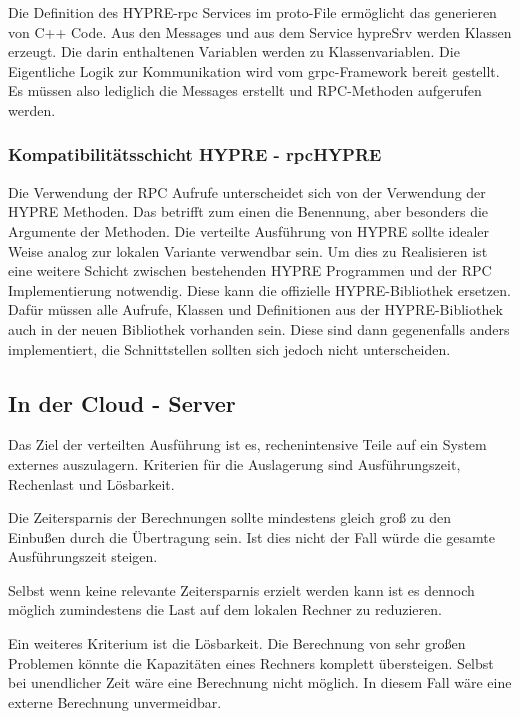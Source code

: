\documentclass[a4paper,10pt]{article}
\numberwithin{figure}{section}
\numberwithin{table}{section}
\begin{document}
Die Definition des HYPRE-rpc Services im proto-File ermöglicht das generieren von C++ Code.
Aus den Messages und aus dem Service hypreSrv werden Klassen erzeugt.
Die darin enthaltenen Variablen werden zu Klassenvariablen.
Die Eigentliche Logik zur Kommunikation wird vom grpc-Framework bereit gestellt.
Es müssen also lediglich die Messages erstellt und RPC-Methoden aufgerufen werden.

\subsubsection{Kompatibilitätsschicht HYPRE - rpcHYPRE}

Die Verwendung der RPC Aufrufe unterscheidet sich von der Verwendung der HYPRE Methoden.
Das betrifft zum einen die Benennung, aber besonders die Argumente der Methoden.
Die verteilte Ausführung von HYPRE sollte idealer Weise analog zur lokalen Variante verwendbar sein.
Um dies zu Realisieren ist eine weitere Schicht zwischen bestehenden HYPRE Programmen und der RPC Implementierung notwendig.
Diese kann die offizielle HYPRE-Bibliothek ersetzen.
Dafür müssen alle Aufrufe, Klassen und Definitionen aus der HYPRE-Bibliothek auch in der neuen Bibliothek vorhanden sein.
Diese sind dann gegenenfalls anders implementiert, die Schnittstellen sollten sich jedoch nicht unterscheiden.

\subsection{In der Cloud - Server}

Das Ziel der verteilten Ausführung ist es, rechenintensive Teile auf ein System externes auszulagern.
Kriterien für die Auslagerung sind Ausführungszeit, Rechenlast und Lösbarkeit.

Die Zeitersparnis der Berechnungen sollte mindestens gleich groß zu den Einbußen durch die Übertragung sein.
Ist dies nicht der Fall würde die gesamte Ausführungszeit steigen.

Selbst wenn keine relevante Zeitersparnis erzielt werden kann ist es dennoch möglich zumindestens die Last auf dem lokalen Rechner zu reduzieren.

Ein weiteres Kriterium ist die Lösbarkeit.
Die Berechnung von sehr großen Problemen könnte die Kapazitäten eines Rechners komplett übersteigen.
Selbst bei unendlicher Zeit wäre eine Berechnung nicht möglich.
In diesem Fall wäre eine externe Berechnung unvermeidbar.
\end{document}
